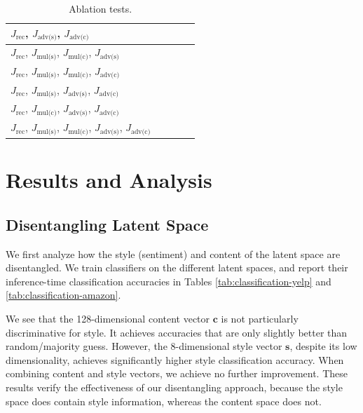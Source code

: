\documentclass[letterpaper]{article} %
\newcommand{\loss}[1]{J_{\text{#1}}}
\begin{document}
\begin{table}[ht]
\begin{tabular}{| l || c | c | c | c |}
		\hline
		$\loss{rec}$, $\loss{adv(s)}$, $\loss{adv(c)}$                                   &                 &                   &                &                 \\
		\hline
		$\loss{rec}$, $\loss{mul(s)}$, $\loss{mul(c)}$, $\loss{adv(s)}$                  &                 &                   &                &                 \\
		\hline
		$\loss{rec}$, $\loss{mul(s)}$, $\loss{mul(c)}$, $\loss{adv(c)}$                  &                 &                   &                &                 \\
		\hline
		$\loss{rec}$, $\loss{mul(s)}$, $\loss{adv(s)}$, $\loss{adv(c)}$                  &                 &                   &                &                 \\
		\hline
		$\loss{rec}$, $\loss{mul(c)}$, $\loss{adv(s)}$, $\loss{adv(c)}$                  &                 &                   &                &                 \\
		\hline
		$\loss{rec}$, $\loss{mul(s)}$, $\loss{mul(c)}$, $\loss{adv(s)}$, $\loss{adv(c)}$ &                 &                   &                &                 \\
		\hline
	\end{tabular}
	\caption{Ablation tests.}
	\label{tab:ablation-results}
\end{table}


\section{Results and Analysis}

\subsection{Disentangling Latent Space}

We first analyze how the style (sentiment) and content of the latent space are disentangled.
We train classifiers on the different latent spaces, and report their inference-time classification accuracies in Tables \ref{tab:classification-yelp} and \ref{tab:classification-amazon}.

We see that the 128-dimensional content vector $\bm c$ is not particularly discriminative for style.
It achieves accuracies that are only slightly better than random/majority guess.
However, the 8-dimensional style vector $\bm s$, despite its low dimensionality, achieves significantly higher style classification accuracy.
When combining content and style vectors, we achieve no further improvement.
These results verify the effectiveness of our disentangling approach, because the style space does contain style information, whereas the content space does not.
\end{document}
